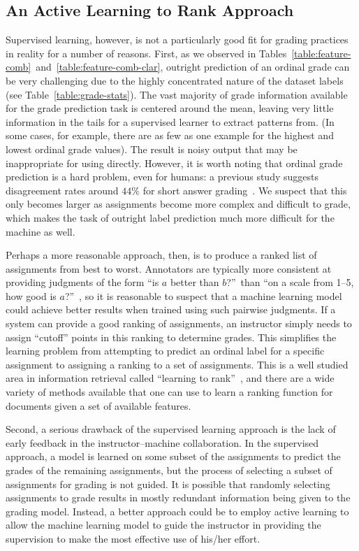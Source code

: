 \subsection{An Active Learning to Rank Approach}
Supervised learning, however, is not a particularly good fit for grading
practices in reality for a number of reasons. First, as we observed in
Tables~\ref{table:feature-comb}~and~\ref{table:feature-comb-clar}, outright
prediction of an ordinal grade can be very challenging due to the highly
concentrated nature of the dataset labels (see
Table~\ref{table:grade-stats}). The vast majority of grade information
available for the grade prediction task is centered around the mean,
leaving very little information in the tails for a supervised learner to
extract patterns from. (In some cases, for example, there are as few as one
example for the highest and lowest ordinal grade values). The result is
noisy output that may be inappropriate for using directly. However, it is
worth noting that ordinal grade prediction is a hard problem, even for
humans: a previous study suggests disagreement rates around $44\%$ for
short answer grading~\cite{Mohler:2009:EACL}. We suspect that this only
becomes larger as assignments become more complex and difficult to grade,
which makes the task of outright label prediction much more difficult for
the machine as well.

Perhaps a more reasonable approach, then, is to produce a ranked list of
assignments from best to worst. Annotators are typically more consistent at
providing judgments of the form ``is $a$ better than $b$?''\ than ``on a
scale from 1--5, how good is $a$?''~\cite{Callison-Burch:2007:WMT}, so it
is reasonable to suspect that a machine learning model could achieve better
results when trained using such pairwise judgments. If a system can provide
a good ranking of assignments, an instructor simply needs to assign
``cutoff'' points in this ranking to determine grades. This simplifies the
learning problem from attempting to predict an ordinal label for a specific
assignment to assigning a ranking to a set of assignments. This is a well
studied area in information retrieval called ``learning to
rank''~\cite{Joachims:2002:KDD}, and there are a wide variety of methods
available that one can use to learn a ranking function for documents given
a set of available features.

Second, a serious drawback of the supervised learning approach is the lack
of early feedback in the instructor--machine collaboration. In the
supervised approach, a model is learned on some subset of the assignments
to predict the grades of the remaining assignments, but the process of
selecting a subset of assignments for grading is not guided. It is possible
that randomly selecting assignments to grade results in mostly redundant
information being given to the grading model. Instead, a better approach
could be to employ active learning to allow the machine learning model to
guide the instructor in providing the supervision to make the most
effective use of his/her effort.

